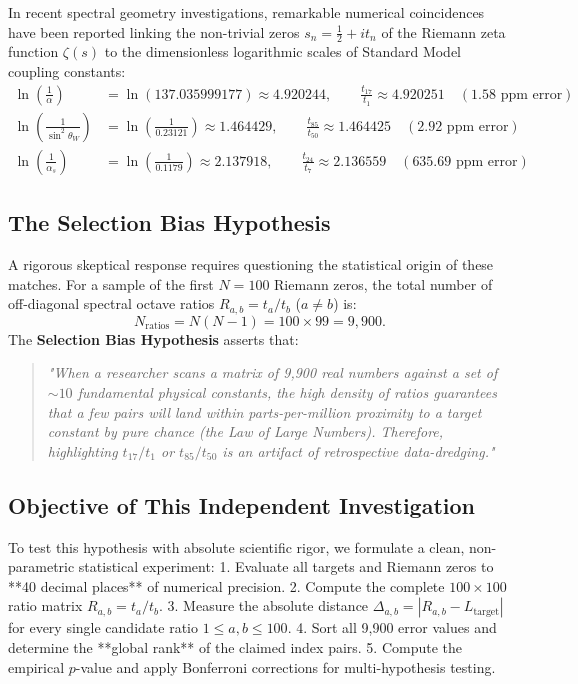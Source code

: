 \documentclass[11pt,a4paper]{article}
\begin{document}
In recent spectral geometry investigations, remarkable numerical coincidences have been reported linking the non-trivial zeros $s_n = \frac{1}{2} + i t_n$ of the Riemann zeta function $\zeta(s)$ to the dimensionless logarithmic scales of Standard Model coupling constants:
\begin{align}
\ln\left( \frac{1}{\alpha} \right) &= \ln(137.035999177) \approx 4.920244, \qquad \frac{t_{17}}{t_1} \approx 4.920251 \quad (1.58 \text{ ppm error}) \\
\ln\left( \frac{1}{\sin^2\theta_W} \right) &= \ln\left( \frac{1}{0.23121} \right) \approx 1.464429, \qquad \frac{t_{85}}{t_{50}} \approx 1.464425 \quad (2.92 \text{ ppm error}) \\
\ln\left( \frac{1}{\alpha_s} \right) &= \ln\left( \frac{1}{0.1179} \right) \approx 2.137918, \qquad \frac{t_{24}}{t_7} \approx 2.136559 \quad (635.69 \text{ ppm error})
\end{align}

\subsection{The Selection Bias Hypothesis}
A rigorous skeptical response requires questioning the statistical origin of these matches. For a sample of the first $N = 100$ Riemann zeros, the total number of off-diagonal spectral octave ratios $R_{a, b} = t_a / t_b$ ($a \neq b$) is:
\begin{equation}
N_{\text{ratios}} = N(N - 1) = 100 \times 99 = 9,900.
\end{equation}
The \textbf{Selection Bias Hypothesis} asserts that:
\begin{quote}
\emph{"When a researcher scans a matrix of 9,900 real numbers against a set of $\sim 10$ fundamental physical constants, the high density of ratios guarantees that a few pairs will land within parts-per-million proximity to a target constant by pure chance (the Law of Large Numbers). Therefore, highlighting $t_{17}/t_1$ or $t_{85}/t_{50}$ is an artifact of retrospective data-dredging."}
\end{quote}

\subsection{Objective of This Independent Investigation}
To test this hypothesis with absolute scientific rigor, we formulate a clean, non-parametric statistical experiment:
1. Evaluate all targets and Riemann zeros to **40 decimal places** of numerical precision.
2. Compute the complete $100 \times 100$ ratio matrix $R_{a, b} = t_a / t_b$.
3. Measure the absolute distance $\Delta_{a, b} = | R_{a, b} - L_{\text{target}} |$ for every single candidate ratio $1 \le a, b \le 100$.
4. Sort all 9,900 error values and determine the **global rank** of the claimed index pairs.
5. Compute the empirical $p$-value and apply Bonferroni corrections for multi-hypothesis testing.
\end{document}
